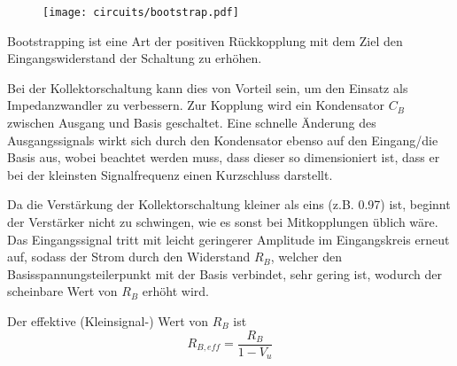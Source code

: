 \begin{figure}[H]
\begin{center}
  \texttt{[image: circuits/bootstrap.pdf]}
  \end{center}
\end{figure}


Bootstrapping ist eine Art der positiven Rückkopplung mit dem Ziel den
Eingangswiderstand der Schaltung zu erhöhen.

Bei der Kollektorschaltung kann
dies von Vorteil sein, um den Einsatz als Impedanzwandler zu verbessern.
Zur Kopplung wird ein Kondensator $C_B$ zwischen Ausgang und Basis geschaltet.
Eine schnelle Änderung des Ausgangssignals wirkt sich durch den Kondensator
ebenso auf den Eingang/die Basis aus, wobei beachtet werden muss, dass dieser so
dimensioniert ist, dass er bei der kleinsten Signalfrequenz einen Kurzschluss
darstellt.

Da die Verstärkung der Kollektorschaltung
kleiner als eins (z.B. 0.97) ist, beginnt der Verstärker nicht zu schwingen, wie es sonst
bei Mitkopplungen üblich wäre. Das Eingangssignal tritt mit leicht geringerer
Amplitude im Eingangskreis erneut auf, sodass der Strom durch den Widerstand
$R_B$, welcher den Basisspannungsteilerpunkt mit der Basis verbindet, sehr
gering ist, wodurch der scheinbare Wert von $R_B$ erhöht wird.

Der effektive (Kleinsignal-) Wert von $R_B$ ist
\[R_{B,eff} = \frac{R_B}{1-V_u}\]
